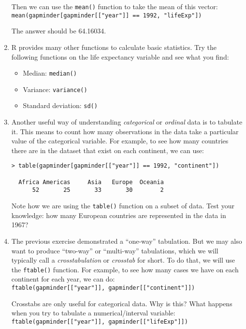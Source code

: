\documentclass[a4paper,12pt]{article}
\begin{document}
\begin{enumerate}
Then we can use the \texttt{mean()} function to take the mean of this vector:\\
\texttt{mean(gapminder[gapminder[["year"]] == 1992, "lifeExp"])}

The answer should be 64.16034.

\item R provides many other functions to calculate basic statistics. Try the following functions on the life expectancy variable and see what you find:

\begin{itemize}
\item Median: \texttt{median()}
\item Variance: \texttt{variance()}
\item Standard deviation: \texttt{sd()}
\end{itemize}

\item Another useful way of understanding \textit{categorical} or \textit{ordinal} data is to tabulate it. This means to count how many observations in the data take a particular value of the categorical variable. For example, to see how many countries there are in the dataset that exist on each continent, we can use:

\begin{verbatim}
> table(gapminder[gapminder[["year"]] == 1992, "continent"])

  Africa Americas     Asia   Europe  Oceania 
      52       25       33       30        2
\end{verbatim}

Note how we are using the \texttt{table()} function on a subset of data. Test your knowledge: how many European countries are represented in the data in 1967?

\item The previous exercise demonstrated a ``one-way'' tabulation. But we may also want to produce ``two-way'' or ``multi-way'' tabulations, which we will typically call a \textit{crosstabulation} or \textit{crosstab} for short. To do that, we will use the \texttt{ftable()} function. For example, to see how many cases we have on each continent for each year, we can do:\\

\texttt{ftable(gapminder[["year"]], gapminder[["continent"]])}

Crosstabs are only useful for categorical data. Why is this? What happens when you try to tabulate a numerical/interval variable:\\
\texttt{ftable(gapminder[["year"]], gapminder[["lifeExp"]])}


\end{enumerate}
\end{document}

